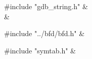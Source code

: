 \medskip
\begin{cxreftabi}
{\stt \#include "gdb\_string.h"} &\\
\hspace*{0.2in}{\stt \#include <string.h>} &\\
\end{cxreftabi}

\medskip
\begin{cxreftabi}
{\stt \#include "../bfd/bfd.h"} &\\
\end{cxreftabi}

\medskip
\begin{cxreftabi}
{\stt \#include "symtab.h"} &\\
\end{cxreftabi}


